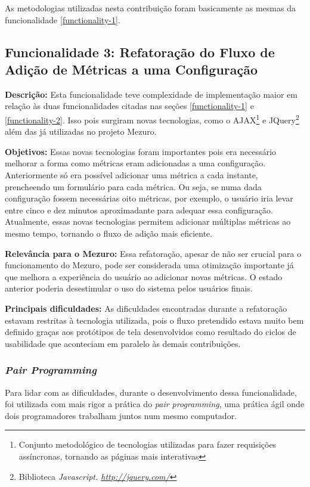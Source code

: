 As metodologias utilizadas nesta contribuição foram basicamente as mesmas da funcionalidade \ref{functionality-1}.

\subsection{Funcionalidade 3: Refatoração do Fluxo de Adição de Métricas a uma Configuração}
\label{functionality-3}

\textbf{Descrição:} Esta funcionalidade teve complexidade de implementação maior em relação às duas funcionalidades citadas nas seções \ref{functionality-1} e \ref{functionality-2}. Isso pois surgiram novas tecnologias, como o AJAX\footnote{Conjunto metodológico de tecnologias utilizadas para fazer requisições assíncronas, tornando as páginas mais interativas} e JQuery\footnote{Biblioteca \textit{Javascript. \url{http://jquery.com/}}} além das já utilizadas no projeto Mezuro. 

\textbf{Objetivos:} Essas novas tecnologias foram importantes pois era necessário melhorar a forma como métricas eram adicionadas a uma configuração. Anteriormente só era possível adicionar uma métrica a cada instante, prencheendo um formulário para cada métrica. Ou seja, se numa dada configuração fossem necessárias oito métricas, por exemplo, o usuário iria levar entre cinco e dez minutos aproximadante para adequar essa configuração. Atualmente, essas novas tecnologias permitem adicionar múltiplas métricas ao mesmo tempo, tornando o fluxo de adição mais eficiente.

\textbf{Relevância para o Mezuro:} Essa refatoração, apesar de não ser crucial para o funcionamento do Mezuro, pode ser considerada uma otimização importante já que melhora a experiência do usuário ao adicionar novas métricas. O estado anterior poderia desestimular o uso do sistema pelos usuários finais. 

\textbf{Principais dificuldades:} As dificuldades encontradas durante a refatoração estavam restritas à tecnologia utilizada, pois o fluxo pretendido estava muito bem definido graças aos protótipos de tela desenvolvidos como resultado do ciclos de usabilidade que aconteciam em paralelo às demais contribuições.

\subsubsection{\textit{Pair Programming}}

Para lidar com as dificuldades, durante o desenvolvimento dessa funcionalidade, foi utilizada com mais rigor a prática do \textit{pair programming}, uma prática ágil onde dois programadores trabalham juntos num mesmo computador.

